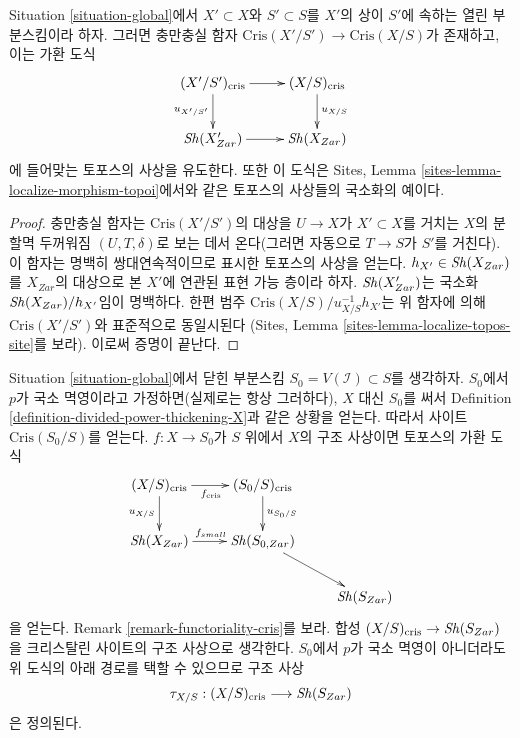 \begin{lemma}
\label{lemma-localize}
Situation \ref{situation-global}에서 $X' \subset X$와 $S' \subset S$를
$X'$의 상이 $S'$에 속하는 열린 부분스킴이라 하자. 그러면
충만충실 함자 $\text{Cris}(X'/S') \to \text{Cris}(X/S)$가 존재하고,
이는 가환 도식
$$
\xymatrix{
(X'/S')_{\text{cris}} \ar[r] \ar[d]_{u_{X'/S'}} &
(X/S)_{\text{cris}} \ar[d]^{u_{X/S}} \\
\Sh(X'_{Zar}) \ar[r] & \Sh(X_{Zar})
}
$$
에 들어맞는 토포스의 사상을 유도한다. 또한 이 도식은 Sites,
Lemma \ref{sites-lemma-localize-morphism-topoi}에서와 같은 토포스의
사상들의 국소화의 예이다.
\end{lemma}

\begin{proof}
충만충실 함자는 $\text{Cris}(X'/S')$의 대상을 $U \to X$가
$X' \subset X$를 거치는 $X$의 분할멱 두꺼워짐
$(U, T, \delta)$로 보는 데서 온다(그러면 자동으로 $T \to S$가
$S'$를 거친다). 이 함자는 명백히 쌍대연속적이므로 표시한
토포스의 사상을 얻는다. $h_{X'} \in \mathop{\mathit{Sh}}\nolimits(X_{Zar})$를
$X_{Zar}$의 대상으로 본 $X'$에 연관된 표현 가능 층이라 하자.
$\mathop{\mathit{Sh}}\nolimits(X'_{Zar})$는 국소화 $\mathop{\mathit{Sh}}\nolimits(X_{Zar})/h_{X'}$임이 명백하다.
한편 범주 $\text{Cris}(X/S)/u_{X/S}^{-1}h_{X'}$는 위 함자에 의해
$\text{Cris}(X'/S')$와 표준적으로 동일시된다
(Sites, Lemma \ref{sites-lemma-localize-topos-site}를 보라).
이로써 증명이 끝난다.
\end{proof}

\begin{remark}[구조 사상]
\label{remark-structure-morphism}
Situation \ref{situation-global}에서 닫힌 부분스킴
$S_0 = V(\mathcal{I}) \subset S$를 생각하자. $S_0$에서 $p$가
국소 멱영이라고 가정하면(실제로는 항상 그러하다), $X$ 대신
$S_0$를 써서 Definition \ref{definition-divided-power-thickening-X}과
같은 상황을 얻는다. 따라서 사이트 $\text{Cris}(S_0/S)$를 얻는다.
$f : X \to S_0$가 $S$ 위에서 $X$의 구조 사상이면 토포스의
가환 도식
$$
\xymatrix{
(X/S)_{\text{cris}}
\ar[r]_{f_{\text{cris}}} \ar[d]_{u_{X/S}} &
(S_0/S)_{\text{cris}} \ar[d]^{u_{S_0/S}} \\
\Sh(X_{Zar}) \ar[r]^{f_{small}} & \Sh(S_{0, Zar}) \ar[rd] \\
& & \Sh(S_{Zar})
}
$$
을 얻는다. Remark \ref{remark-functoriality-cris}를 보라.
합성 $(X/S)_{\text{cris}} \to \mathop{\mathit{Sh}}\nolimits(S_{Zar})$을 크리스탈린 사이트의
구조 사상으로 생각한다. $S_0$에서 $p$가 국소 멱영이 아니더라도
위 도식의 아래 경로를 택할 수 있으므로 구조 사상
$$
\tau_{X/S} : (X/S)_{\text{cris}} \longrightarrow \mathop{\mathit{Sh}}\nolimits(S_{Zar})
$$
은 정의된다.
\end{remark}

